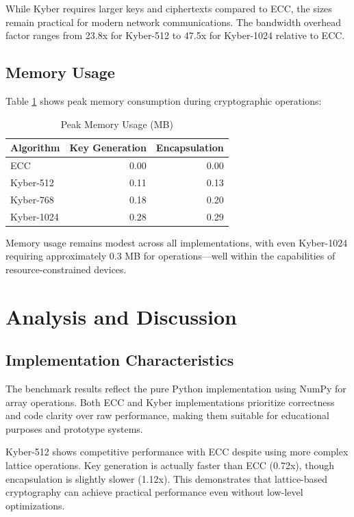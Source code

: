 While Kyber requires larger keys and ciphertexts compared to ECC, the sizes remain practical for modern network communications. The bandwidth overhead factor ranges from 23.8x for Kyber-512 to 47.5x for Kyber-1024 relative to ECC.

\subsection{Memory Usage}

Table \ref{tab:memory} shows peak memory consumption during cryptographic operations:

\begin{table}[!htbp]
\centering
\caption{\label{tab:memory}Peak Memory Usage (MB)}
\begin{tabular}{l|r|r}
\hline
\textbf{Algorithm} & \textbf{Key Generation} & \textbf{Encapsulation} \\ \hline
ECC & 0.00 & 0.00 \\
Kyber-512 & 0.11 & 0.13 \\
Kyber-768 & 0.18 & 0.20 \\
Kyber-1024 & 0.28 & 0.29 \\ \hline
\end{tabular}
\end{table}

Memory usage remains modest across all implementations, with even Kyber-1024 requiring approximately 0.3 MB for operations—well within the capabilities of resource-constrained devices.

\section{Analysis and Discussion}

\subsection{Implementation Characteristics}

The benchmark results reflect the pure Python implementation using NumPy for array operations. Both ECC and Kyber implementations prioritize correctness and code clarity over raw performance, making them suitable for educational purposes and prototype systems.

Kyber-512 shows competitive performance with ECC despite using more complex lattice operations. Key generation is actually faster than ECC (0.72x), though encapsulation is slightly slower (1.12x). This demonstrates that lattice-based cryptography can achieve practical performance even without low-level optimizations.

